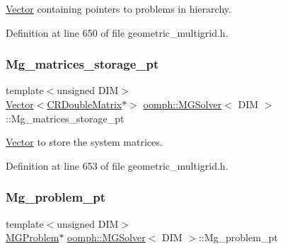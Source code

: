\hyperlink{classoomph_1_1Vector}{Vector} containing pointers to problems in hierarchy. 



Definition at line 650 of file geometric\+\_\+multigrid.\+h.

\mbox{\label{classoomph_1_1MGSolver_a90b372c8339dda0589493bd1a1b58b6a}} 
\subsubsection{\texorpdfstring{Mg\+\_\+matrices\+\_\+storage\+\_\+pt}{Mg\_matrices\_storage\_pt}}
{\footnotesize\ttfamily template$<$unsigned D\+IM$>$ \\
\hyperlink{classoomph_1_1Vector}{Vector}$<$\hyperlink{classoomph_1_1CRDoubleMatrix}{C\+R\+Double\+Matrix}$\ast$$>$ \hyperlink{classoomph_1_1MGSolver}{oomph\+::\+M\+G\+Solver}$<$ D\+IM $>$\+::Mg\+\_\+matrices\+\_\+storage\+\_\+pt\hspace{0.3cm}{\ttfamily [private]}}



\hyperlink{classoomph_1_1Vector}{Vector} to store the system matrices. 



Definition at line 653 of file geometric\+\_\+multigrid.\+h.

\mbox{\label{classoomph_1_1MGSolver_af48a7c051423b2a5d27b19aa8adb996a}} 
\subsubsection{\texorpdfstring{Mg\+\_\+problem\+\_\+pt}{Mg\_problem\_pt}}
{\footnotesize\ttfamily template$<$unsigned D\+IM$>$ \\
\hyperlink{classoomph_1_1MGProblem}{M\+G\+Problem}$\ast$ \hyperlink{classoomph_1_1MGSolver}{oomph\+::\+M\+G\+Solver}$<$ D\+IM $>$\+::Mg\+\_\+problem\+\_\+pt\hspace{0.3cm}{\ttfamily [protected]}}



